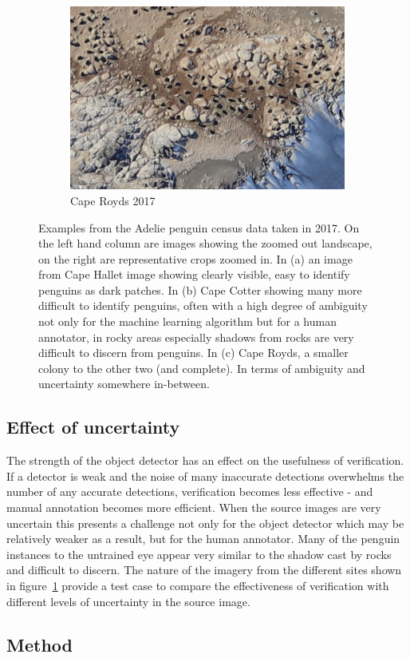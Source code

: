 \begin{figure}[h!]
\begin{subfigure}[t]{1.0\linewidth}
  \hfill
  \includegraphics[width=0.475\linewidth]{figures/annotation/penguin/royds.jpg}
  \caption{Cape Royds 2017}
\end{subfigure}

\caption{Examples from the Adelie penguin census data taken in 2017. On the left hand column are images showing the zoomed out landscape, on the right are representative crops zoomed in.  In (a) an image from Cape Hallet image showing clearly visible, easy to identify penguins as dark patches. In (b) Cape Cotter showing many more difficult to identify penguins, often with a high degree of ambiguity not only for the machine learning algorithm but for a human annotator, in rocky areas especially shadows from rocks are very difficult to discern from penguins. In (c) Cape Royds, a smaller colony to the other two (and complete). In terms of ambiguity and uncertainty somewhere in-between. }
\label {fig:penguin_examples}
\end{figure}


\subsection {Effect of uncertainty}

 The strength of the object detector has an effect on the usefulness of verification. If a detector is weak and the noise of many inaccurate detections overwhelms the number of any accurate detections, verification becomes less effective - and manual annotation becomes more efficient. When the source images are very uncertain this presents a challenge not only for the object detector which may be relatively weaker as a result, but for the human annotator. Many of the penguin instances to the untrained eye appear very similar to the shadow cast by rocks and difficult to discern. The nature of the imagery from the different sites shown in figure~\ref{fig:penguin_examples} provide a test case to compare the effectiveness of verification with different levels of uncertainty in the source image. 

\subsection {Method}

